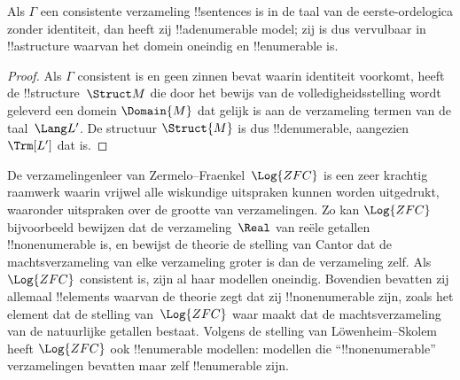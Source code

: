 \documentclass[openany]{memoir}
\begin{document}
\begin{thm}
 Als $\Gamma$ een consistente verzameling
!!{sentence}s is in de taal van de eerste-ordelogica zonder identiteit,
dan heeft zij !!a{denumerable} model; zij is dus vervulbaar in
!!a{structure} waarvan het domein oneindig en !!{enumerable} is.
\end{thm}

\begin{proof}
Als $\Gamma$ consistent is en geen zinnen bevat waarin identiteit
voorkomt, heeft de !!{structure}~$\Struct M$ die door het bewijs van de
volledigheidsstelling wordt geleverd een domein $\Domain{M}$ dat gelijk
is aan de verzameling termen van de taal~$\Lang L'$. De structuur
$\Struct{M}$ is dus !!{denumerable}, aangezien $\Trm[L']$ dat is.
\end{proof}

\begin{ex}
De verzamelingenleer van Zermelo--Fraenkel~$\Log{ZFC}$ is een zeer
krachtig raamwerk waarin vrijwel alle wiskundige uitspraken kunnen
worden uitgedrukt, waaronder uitspraken over de grootte van
verzamelingen. Zo kan $\Log{ZFC}$ bijvoorbeeld bewijzen dat de
verzameling~$\Real$ van reële getallen !!{nonenumerable} is, en bewijst
de theorie de stelling van Cantor dat de machtsverzameling van elke
verzameling groter is dan de verzameling zelf. Als $\Log{ZFC}$
consistent is, zijn al haar modellen oneindig. Bovendien bevatten zij
allemaal !!{element}s waarvan de theorie zegt dat zij !!{nonenumerable}
zijn, zoals het element dat de stelling van~$\Log{ZFC}$ waar maakt dat de
machtsverzameling van de natuurlijke getallen bestaat. Volgens de
stelling van L\"owenheim--Skolem heeft $\Log{ZFC}$ ook !!{enumerable}
modellen: modellen die ``!!{nonenumerable}'' verzamelingen bevatten maar
zelf !!{enumerable} zijn.
\end{ex}
\endgroup
\OLEndChapterHook
\OLEndPartHook

\begingroup
\def\olfilename{OLP-0138}
\def\olfilepath{content/first-order-logic/}
\hypertarget{unit-OLP-0138}{}
\end{document}
